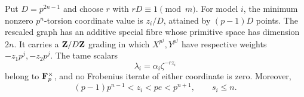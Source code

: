 \begin{lemma}\label{pg-lem:scaling}
Put $D=p^{2n-1}$ and choose $r$ with $rD\equiv1\pmod m$. For model $i$, the minimum nonzero $p^n$-torsion coordinate value is $z_i/D$, attained by $(p-1)D$ points. The rescaled graph has an additive special fibre whose primitive space has dimension $2n$. It carries a $\mathbf Z/D\mathbf Z$ grading in which $X^{p^j},Y^{p^j}$ have respective weights $-z_1p^j,-z_2p^j$. The tame scalars
\begin{equation}\label{pg-eq:lambda}
 \lambda_i=\alpha_i\zeta^{-rz_i}
\end{equation}
belong to $\mathbf F_p^\times$, and no Frobenius iterate of either coordinate is zero. Moreover,
\begin{equation}\label{pg-eq:bounds}
 (p-1)p^{n-1}<z_i<pe<p^{n+1},\qquad s_i\le n.
\end{equation}
\end{lemma}
